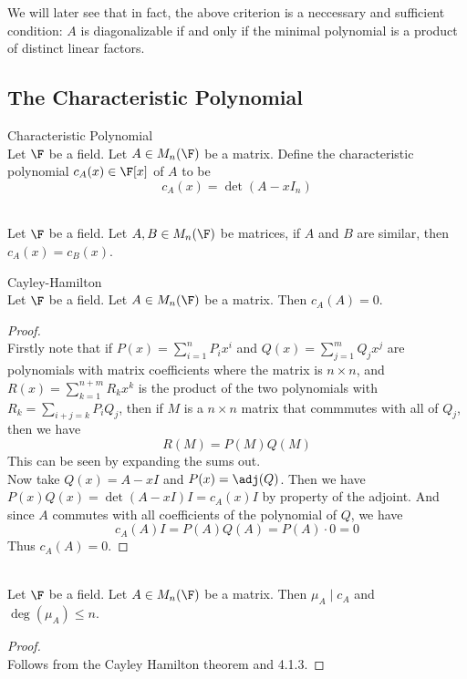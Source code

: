 \documentclass[a4paper]{article}
\begin{document}
We will later see that in fact, the above criterion is a neccessary and sufficient condition: $A$ is diagonalizable if and only if the minimal polynomial is a product of distinct linear factors. 

\subsection{The Characteristic Polynomial}
\begin{defn}{Characteristic Polynomial}{}\\
Let $\F$ be a field. Let $A\in M_n(\F)$ be a matrix. Define the characteristic polynomial $c_A(x)\in\F[x]$ of $A$ to be $$c_A(x)=\det(A-xI_n)$$
\end{defn}

\begin{lmm}{}{}\\
Let $\F$ be a field. Let $A,B\in M_n(\F)$ be matrices, if $A$ and $B$ are similar, then $c_A(x)=c_B(x)$. 
\end{lmm}

\begin{thm}{Cayley-Hamilton}{}\\
Let $\F$ be a field. Let $A\in M_n(\F)$ be a matrix. Then $c_A(A)=0$. 
\begin{proof}\\
Firstly note that if $P(x)=\sum_{i=1}^nP_ix^i$ and $Q(x)=\sum_{j=1}^mQ_jx^j$ are polynomials with matrix coefficients where the matrix is $n\times n$, and $R(x)=\sum_{k=1}^{n+m}R_kx^k$ is the product of the two polynomials with $R_k=\sum_{i+j=k}P_iQ_j$, then if $M$ is a $n\times n$ matrix that commmutes with all of $Q_j$, then we have $$R(M)=P(M)Q(M)$$
This can be seen by expanding the sums out. \\
Now take $Q(x)=A-xI$ and $P(x)=\adj(Q)$. Then we have $P(x)Q(x)=\det(A-xI)I=c_A(x)I$ by property of the adjoint. And since $A$ commutes with all coefficients of the polynomial of $Q$, we have $$c_A(A)I=P(A)Q(A)=P(A)\cdot 0=0$$ Thus $c_A(A)=0$. 
\end{proof}
\end{thm}

\begin{crl}{}{}\\
Let $\F$ be a field. Let $A\in M_n(\F)$ be a matrix. Then $\mu_A\;|\;c_A$ and $\deg(\mu_A)\leq n$. 
\begin{proof}\\
Follows from the Cayley Hamilton theorem and 4.1.3. 
\end{proof}
\end{crl}
\end{document}
